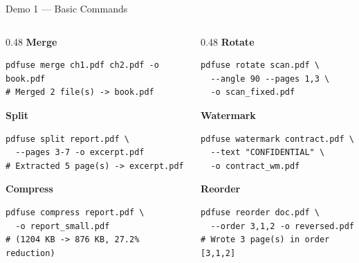\documentclass[aspectratio=169]{beamer}
\begin{document}
\begin{frame}[fragile]{Demo 1 --- Basic Commands}
  \begin{columns}[T]
    \begin{column}{0.48\textwidth}
      \textbf{Merge}
      \begin{lstlisting}
pdfuse merge ch1.pdf ch2.pdf -o book.pdf
# Merged 2 file(s) -> book.pdf
      \end{lstlisting}
      \vspace{2pt}
      \textbf{Split}
      \begin{lstlisting}
pdfuse split report.pdf \
  --pages 3-7 -o excerpt.pdf
# Extracted 5 page(s) -> excerpt.pdf
      \end{lstlisting}
      \vspace{2pt}
      \textbf{Compress}
      \begin{lstlisting}
pdfuse compress report.pdf \
  -o report_small.pdf
# (1204 KB -> 876 KB, 27.2% reduction)
      \end{lstlisting}
    \end{column}
    \begin{column}{0.48\textwidth}
      \textbf{Rotate}
      \begin{lstlisting}
pdfuse rotate scan.pdf \
  --angle 90 --pages 1,3 \
  -o scan_fixed.pdf
      \end{lstlisting}
      \vspace{2pt}
      \textbf{Watermark}
      \begin{lstlisting}
pdfuse watermark contract.pdf \
  --text "CONFIDENTIAL" \
  -o contract_wm.pdf
      \end{lstlisting}
      \vspace{2pt}
      \textbf{Reorder}
      \begin{lstlisting}
pdfuse reorder doc.pdf \
  --order 3,1,2 -o reversed.pdf
# Wrote 3 page(s) in order [3,1,2]
      \end{lstlisting}
    \end{column}
  \end{columns}
\end{frame}
\end{document}
